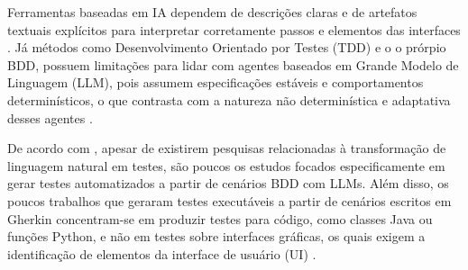 Ferramentas baseadas em IA dependem de descrições claras e de artefatos textuais explícitos para interpretar corretamente passos e elementos das interfaces \cite{Ferreira2025}. Já métodos como Desenvolvimento Orientado por Testes (TDD) e o  o prórpio BDD, possuem limitações para lidar com agentes baseados em Grande Modelo de Linguagem (LLM), pois assumem especificações estáveis e comportamentos determinísticos, o que contrasta com a natureza não determinística e adaptativa desses agentes \cite{Xia2025}.

De acordo com , apesar de existirem pesquisas relacionadas à transformação de linguagem natural em testes, são poucos os estudos focados especificamente em gerar testes automatizados a partir de cenários BDD com LLMs. Além disso, os poucos trabalhos que geraram testes executáveis a partir de cenários escritos em Gherkin concentram-se em produzir testes para código, como classes Java ou funções Python, e não em testes sobre interfaces gráficas, os quais exigem a identificação de elementos da interface de usuário (UI) \cite{Ferreira2025}. 

